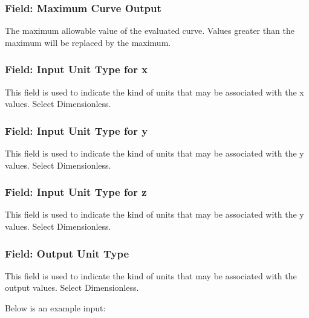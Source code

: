 \subsubsection{Field: Maximum Curve Output}\label{field-maximum-curve-output-7}

The maximum allowable value of the evaluated curve. Values greater than the maximum will be replaced by the maximum.

\subsubsection{Field: Input Unit Type for x}\label{field-input-unit-type-for-x-9}

This field is used to indicate the kind of units that may be associated with the x values. Select Dimensionless.

\subsubsection{Field: Input Unit Type for y}\label{field-input-unit-type-for-y-4}

This field is used to indicate the kind of units that may be associated with the y values. Select Dimensionless.

\subsubsection{Field: Input Unit Type for z}\label{field-input-unit-type-for-z-1}

This field is used to indicate the kind of units that may be associated with the y values. Select Dimensionless.

\subsubsection{Field: Output Unit Type}\label{field-output-unit-type-8}

This field is used to indicate the kind of units that may be associated with the output values. Select Dimensionless.

Below is an example input:

